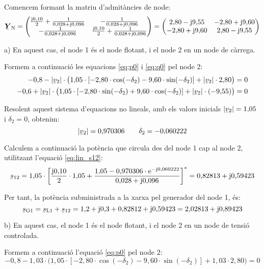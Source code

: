 \begin{exemple}
Comencem formant la matriu d'admit\`{a}ncies de node:
\[
\mcmplx{Y}\ped{N} = \begin{pmatrix}
  \frac{\ju 0{,}10}{2} + \frac{1}{0{,}028+\ju0{,}096} & -\frac{1}{0{,}028+\ju0{,}096} \\
  -\frac{1}{0{,}028+\ju0{,}096} & \frac{\ju 0{,}10}{2} + \frac{1}{0{,}028+\ju0{,}096} \\
\end{pmatrix} =
\begin{pmatrix}
  2{,}80 -\ju9{,}55 & -2{,}80 +\ju9{,}60 \\
  -2{,}80 +\ju9{,}60 & 2{,}80 -\ju9{,}55 \\
\end{pmatrix}
\]

a) En aquest cas, el node 1 \'{e}s el node flotant, i el node 2 en un node de c\`{a}rrega.

Formem a continuaci\'{o} les equacions \eqref{eq:p0} i \eqref{eq:q0} pel node 2:
\begin{align*}
-0{,}8 - |\cmplx{v}_2| \cdot \bigl( 1{,}05\cdot [-2{,}80\cdot \cos(-\delta_2) - 9{,}60 \cdot
\sin( -\delta_2)]  + |\cmplx{v}_2| \cdot 2{,}80 \bigr) &= 0 \\
-0{,}6 + |\cmplx{v}_2| \cdot\bigl( 1{,}05 \cdot[-2{,}80\cdot\sin(-\delta_2) +
9{,}60\cdot\cos( -\delta_2)]  + |\cmplx{v}_2|\cdot (-9{,}55) \bigr) &= 0
\end{align*}

Resolent aquest sistema d'equacions no lineals, amb els valors inicials $|\cmplx{v}_2|=1{,}05$ i $\delta_2=0$, obtenim:
\[ |\cmplx{v}_2|=0{,}970306 \qquad \delta_2=-0{,}060222 \]

Calculem a continuaci\'{o} la pot\`{e}ncia que circula des del node 1 cap al node 2, utilitzant l'equaci\'{o} \eqref{eq:lin_s12}:
\[
\cmplx{s}_{12} = 1{,}05\cdot \left[ \frac{\ju0{,}10}{2} \cdot1{,}05 + \frac{ 1{,}05 -
0{,}970306\cdot\eu^{-\ju0{,}060222}} {0{,}028+\ju0{,}096} \right]^* = 0{,}82813 + \ju
0{,}59423
\]

Per tant, la pot\`{e}ncia subministrada a la xarxa pel generador del node 1, \'{e}s:
\[ \cmplx{s}\ped{G1} = \cmplx{s}\ped{L1} + \cmplx{s}_{12} = 1{,}2+\ju0{,}3 + 0{,}82812 + \ju 0{,}59423 = 2{,}02813 + \ju 0{,}89423 \]

b) En aquest cas, el node 1 \'{e}s el node flotant, i el node 2 en un node de tensi\'{o} controlada.

Formem a continuaci\'{o} l'equaci\'{o} \eqref{eq:p0} pel node 2:
\[
-0{,}8 - 1{,}03\cdot \bigl( 1{,}05\cdot [-2{,}80\cdot\cos(-\delta_2) - 9{,}60\cdot\sin(
-\delta_2)] + 1{,}03\cdot 2{,}80 \bigr) = 0
\]


\end{exemple}
